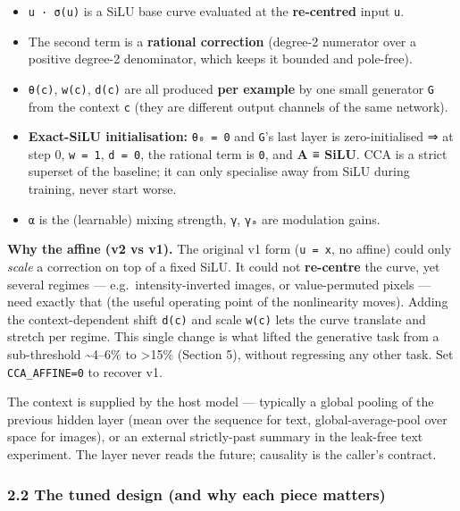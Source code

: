 \documentclass[
  11pt,
]{article}
\providecommand{\tightlist}{%
  \setlength{\itemsep}{0pt}\setlength{\parskip}{0pt}}
\begin{document}
\begin{itemize}
\tightlist
\item
  \texttt{u\ ·\ σ(u)} is a SiLU base curve evaluated at the
  \textbf{re-centred} input \texttt{u}.
\item
  The second term is a \textbf{rational correction} (degree-2 numerator
  over a positive degree-2 denominator, which keeps it bounded and
  pole-free).
\item
  \texttt{θ(c)}, \texttt{w(c)}, \texttt{d(c)} are all produced
  \textbf{per example} by one small generator \texttt{G} from the
  context \texttt{c} (they are different output channels of the same
  network).
\item
  \textbf{Exact-SiLU initialisation:} \texttt{θ₀\ =\ 0} and \texttt{G}'s
  last layer is zero-initialised ⇒ at step 0, \texttt{w\ =\ 1},
  \texttt{d\ =\ 0}, the rational term is \texttt{0}, and \textbf{A ≡
  SiLU}. CCA is a strict superset of the baseline; it can only
  specialise away from SiLU during training, never start worse.
\item
  \texttt{α} is the (learnable) mixing strength, \texttt{γ}, \texttt{γₐ}
  are modulation gains.
\end{itemize}

\textbf{Why the affine (v2 vs v1).} The original v1 form
(\texttt{u\ =\ x}, no affine) could only \emph{scale} a correction on
top of a fixed SiLU. It could not \textbf{re-centre} the curve, yet
several regimes --- e.g.~intensity-inverted images, or value-permuted
pixels --- need exactly that (the useful operating point of the
nonlinearity moves). Adding the context-dependent shift \texttt{d(c)}
and scale \texttt{w(c)} lets the curve translate and stretch per regime.
This single change is what lifted the generative task from a
sub-threshold \textasciitilde4--6\% to \textgreater15\% (Section 5),
without regressing any other task. Set \texttt{CCA\_AFFINE=0} to recover
v1.

The context is supplied by the host model --- typically a global pooling
of the previous hidden layer (mean over the sequence for text,
global-average-pool over space for images), or an external strictly-past
summary in the leak-free text experiment. The layer never reads the
future; causality is the caller's contract.

\subsubsection{2.2 The tuned design (and why each piece
matters)}\label{the-tuned-design-and-why-each-piece-matters}
\end{document}
